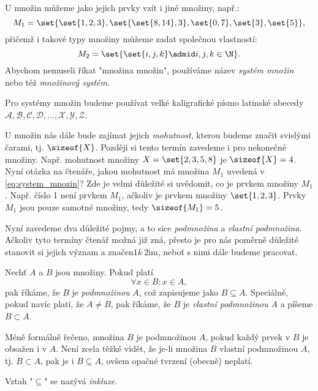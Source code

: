 U množin můžeme jako jejich prvky vzít i jiné množiny, např.:
\begin{equation}\label{eq:system_mnozin}
    M_1=\set{\set{1,2,3},\set{\set{8,14},3},\set{0,7}, \set{3}, \set{5}},
\end{equation}
přičemž i takové typy množiny můžeme zadat společnou vlastností:
\begin{equation*}
    M_2=\set{\set{i,j,k} \admid i,j,k\in\N}.
\end{equation*}
Abychom nemuseli říkat "množina množin", používáme název \emph{systém množin} nebo též \emph{množinový systém}.
\begin{convention}
    Pro systémy množin budeme používat velké kaligrafické písmo latinské abecedy $\mathcal{A},\mathcal{B},\mathcal{C},\mathcal{D},\dots,\mathcal{X},\mathcal{Y},\mathcal{Z}$.
\end{convention}
U množin nás dále bude zajímat jejich \emph{mohutnost}, kterou budeme značit svislými čarami, tj. $\sizeof{X}$. Později si tento termín zavedeme i pro nekonečné množiny. Např. mohutnost množiny $X=\set{2,3,5,8}$ je $\sizeof{X}=4$. Nyní otázka na čtenáře, jakou mohutnost má množina $M_1$ uvedená v \eqref{eq:system_mnozin}? Zde je velmi důležité si uvědomit, co je prvkem množiny $M_1$. Např. číslo 1 není prvkem $M_1$, ačkoliv je prvkem množiny $\set{1,2,3}$. Prvky $M_1$ jsou pouze samotné množiny, tedy $\sizeof{M_1}=5$.\par
\medskip
Nyní zavedeme dva důležité pojmy, a to sice \emph{podmnožina} a \emph{vlastní podmnožina}. Ačkoliv tyto termíny čtenář možná již zná, přesto je pro nás poměrně důležité stanovit si jejich význam a značen$1 k~$2im, neboť s nimi dále budeme pracovat.
\begin{definition}\label{def:podmnozina}
    Nechť $A$ a $B$ jsou množiny. Pokud platí
    \begin{equation*}
        \forall x\in B: x\in A,
    \end{equation*}
    pak říkáme, že $B$ je \emph{podmnožinou} $A$, což zapisujeme jako $B \subseteq A$. Speciálně, pokud navíc platí, že $A \neq B$, pak říkáme, že $B$ je \emph{vlastní podmnožinou} $A$ a píšeme $B \subset A$.
\end{definition}
Méně formálně řečeno, množina $B$ je podmnožinou $A$, pokud každý prvek v $B$ je obsažen i v $A$. Není zcela těžké vidět, že je-li množina $B$ vlastní podmnožinou $A$, tj. $B \subset A$, pak je i $B \subseteq A$, ovšem opačné tvrzení (obecně) neplatí.
\begin{remark}
    Vztah "$\subseteq$" se nazývá \emph{inkluze}.
\end{remark}
